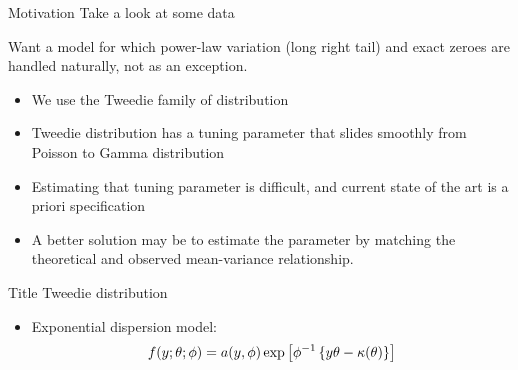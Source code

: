 \documentclass[12pt,t]{beamer}
\newcommand{\subt}[1]{{\footnotesize \color{subtitle} {#1}}}
\begin{document}
\begin{frame}{Motivation}
\subt{Take a look at some data}

Want a model for which power-law variation (long right tail) and exact zeroes are handled naturally, not as an exception.

\begin{itemize}
    \item We use the Tweedie family of distribution
    \item Tweedie distribution has a tuning parameter that slides smoothly from Poisson to Gamma distribution
    \item Estimating that tuning parameter is difficult, and current state of the art is a priori specification
    \item A better solution may be to estimate the parameter by matching the theoretical and observed mean-variance relationship.
\end{itemize}

\end{frame}




%
%


\begin{frame}{Title}
\subt{Tweedie distribution}
\bigskip

\begin{itemize}
  \item Exponential dispersion model:
    \begin{align}
        f(y;\theta;\phi) = a(y,\phi) \exp \left[ \phi^{-1} \left\{ y\theta - \kappa(\theta) \right\} \right] \notag
    \end{align}
\end{itemize}

\end{frame}
\end{document}
